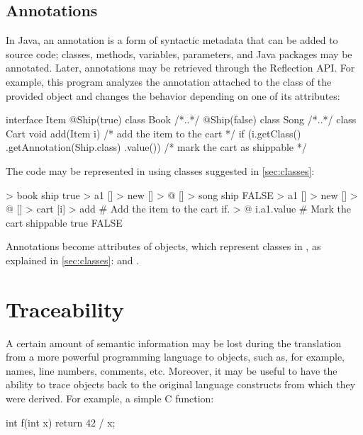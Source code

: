\documentclass[sigplan,nonacm]{acmart}
\begin{document}
\subsection{Annotations}
\label{sec:annotations}

In Java, an annotation is a form of syntactic metadata that can be added to source code; classes, methods, variables, parameters, and Java packages may be annotated. Later, annotations may be retrieved through the Reflection API. For example, this program analyzes the annotation attached to the class of the provided object and changes the behavior depending on one of its attributes:

\begin{ffcode}
interface Item {}
@Ship(true) class Book { /*..*/ }
@Ship(false) class Song { /*..*/ }
class Cart {
  void add(Item i) {
    /* add the item to the cart */
    if (i.getClass()
      .getAnnotation(Ship.class)
      .value()) {
      /* mark the cart as shippable */
    }
  }
}
\end{ffcode}

The code may be represented in \eolang{} using classes suggested in \cref{sec:classes}:

\begin{ffcode}
[] > book
  ship true > a1
  [] > new
    [] > @
[] > song
  ship FALSE > a1
  [] > new
    [] > @
[] > cart
  [i] > add
    # Add the item to the cart
    if. > @
      i.a1.value
        # Mark the cart shippable
        true
        FALSE
\end{ffcode}

Annotations become attributes of objects, which represent classes in \eolang{}, as explained in \cref{sec:classes}:  and .

\section{Traceability}

A certain amount of semantic information may be lost during the translation from a more powerful programming language to \eolang{} objects, such as, for example, names, line numbers, comments, etc. Moreover, it may be useful to have the ability to trace \eolang{} objects back to the original language constructs from which they were derived. For example, a simple C function:

\begin{ffcode}
int f(int x) {
  return 42 / x;
}
\end{ffcode}
\end{document}
